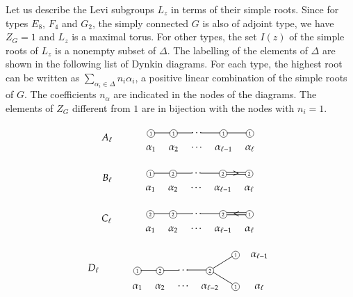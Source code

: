 \documentclass[11pt,oneside,dvipsnames]{amsart}
\theoremstyle{plain}
\theoremstyle{definition}
\theoremstyle{named}
\newcommand*\circled[1]{
  \tikz[baseline=(char.base)]\node[shape=circle,draw,inner sep=0.2pt,font=\tiny,minimum size=8pt] (char) {#1};}
\begin{document}
Let us describe the Levi subgroups $L_z$ in terms of their simple roots. Since for types $E_8$, $F_4$ and $G_2$, the simply connected $G$ is also of adjoint type, we have $Z_G=1$ and $L_z$ is a maximal torus. For other types, the set $I(z)$ of the simple roots of $L_z$ is a nonempty subset of $\Delta$. The labelling of the elements of $\Delta$ are shown in the following list of Dynkin diagrams. For each type, the highest root can be written as $\sum_{\alpha_i\in\Delta}n_i\alpha_i$, a positive linear combination of the simple roots of $G$. The coefficients $n_{\alpha}$ are indicated in the nodes of the diagrams. The elements of $Z_G$ different from $1$ are in bijection with the nodes with $n_i=1$.

$$
A_{\ell}\quad\quad\quad
\begin{tikzcd}[row sep=0em, column sep=0.2em]
\circled{1} \arrow[rr, swap, shorten=-2mm, dash, yshift=-0.1mm]  && \circled{1} \arrow[rr, swap, shorten=-2mm, dash, yshift=-0.1mm] && \cdots \arrow[rr, swap, shorten=-2mm, dash, yshift=-0.1mm] && \circled{1} \arrow[rr, swap, shorten=-2mm, dash, yshift=-0.1mm] && \circled{1}\\
\alpha_1 && \alpha_2 && \cdots && \alpha_{\ell-1} && \alpha_{\ell}
\end{tikzcd}
$$

$$
B_{\ell}\quad\quad\quad
\begin{tikzcd}[row sep=0em, column sep=0.2em]
\circled{1} \arrow[rr, swap, shorten=-2mm, dash, yshift=-0.1mm]  && \circled{2} \arrow[rr, swap, shorten=-2mm, dash, yshift=-0.1mm] && \cdots \arrow[rr, swap, shorten=-2mm, dash, yshift=-0.1mm] && \circled{2} \arrow[rr, swap, shorten=-2mm, equal, yshift=-0.1mm, ">" marking] && \circled{2}\\
\alpha_1 && \alpha_2 && \cdots && \alpha_{\ell-1} && \alpha_{\ell}
\end{tikzcd}
$$

$$
C_{\ell}\quad\quad\quad
\begin{tikzcd}[row sep=0em, column sep=0.2em]
\circled{2} \arrow[rr, swap, shorten=-2mm, dash, yshift=-0.1mm]  && \circled{2} \arrow[rr, swap, shorten=-2mm, dash, yshift=-0.1mm] && \cdots \arrow[rr, swap, shorten=-2mm, dash, yshift=-0.1mm] && \circled{2} \arrow[rr, swap, shorten=-2mm, equal, yshift=-0.1mm, "<" marking] && \circled{1}\\
\alpha_1 && \alpha_2 && \cdots && \alpha_{\ell-1} && \alpha_{\ell}
\end{tikzcd}
$$

$$
D_{\ell}\quad\quad\quad
\begin{tikzcd}[row sep=0em, column sep=0.2em]
&& && && && \circled{1} & \alpha_{\ell-1}\\
\circled{1} \arrow[rr, swap, shorten=-2mm, dash, yshift=-0.1mm]  && \circled{2} \arrow[rr, swap, shorten=-2mm, dash, yshift=-0.1mm] && \cdots \arrow[rr, swap, shorten=-2mm, dash] && \circled{2} \arrow[drr, swap, shorten=-2.5mm, dash, yshift=-0.1mm] \arrow[urr, swap, shorten=-2.5mm, dash, yshift=-0.1mm] &&  &\\
\alpha_1 && \alpha_2 && \cdots && \alpha_{\ell-2} && \circled{1} & \alpha_{\ell} 
\end{tikzcd}
$$
\end{document}

